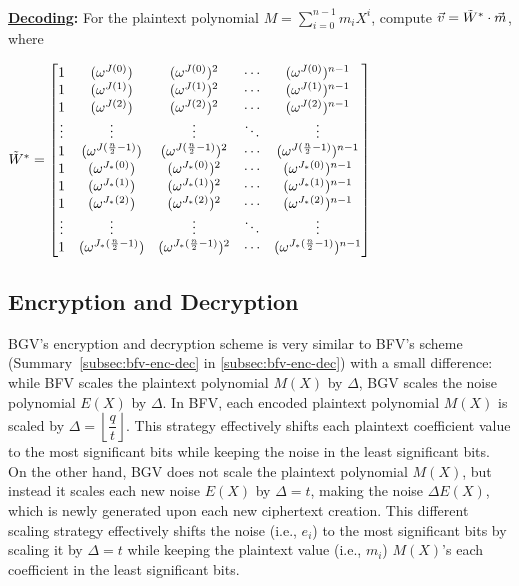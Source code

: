 \begin{tcolorbox}[title={\textbf{\tboxlabel{\ref*{subsec:bgv-encoding-decoding}} BGV's Encoding and Decoding}}]
$ $

\textbf{\underline{Decoding}:} For the plaintext polynomial $M = \sum\limits_{i=0}^{n-1} m_iX^i$, 
compute $\vec{v} = \tilde W^* \cdot \vec{m}$, where 

$\tilde{W}^* = \begin{bmatrix}
1 & (\omega^{J(0)}) & (\omega^{J(0)})^2 & \cdots & (\omega^{J(0)})^{n-1}\\
1 & (\omega^{J(1)}) & (\omega^{J(1)})^2 & \cdots & (\omega^{J(1)})^{n-1}\\
1 & (\omega^{J(2)}) & (\omega^{J(2)})^2 & \cdots & (\omega^{J(2)})^{n-1}\\
\vdots & \vdots & \vdots & \ddots & \vdots \\
1 & (\omega^{J(\frac{n}{2}-1)}) & (\omega^{J(\frac{n}{2}-1)})^2 & \cdots & (\omega^{J(\frac{n}{2}-1)})^{n-1}\\
1 & (\omega^{J_*(0)}) & (\omega^{J_*(0)})^2 & \cdots & (\omega^{J_*(0)})^{n-1}\\
1 & (\omega^{J_*(1)}) & (\omega^{J_*(1)})^2 & \cdots & (\omega^{J_*(1)})^{n-1}\\
1 & (\omega^{J_*(2)}) & (\omega^{J_*(2)})^2 & \cdots & (\omega^{J_*(2)})^{n-1}\\
\vdots & \vdots & \vdots & \ddots & \vdots \\
1 & (\omega^{J_*(\frac{n}{2}-1)}) & (\omega^{J_*(\frac{n}{2}-1)})^2 & \cdots & (\omega^{J_*(\frac{n}{2}-1)})^{n-1}\\
\end{bmatrix}$

\end{tcolorbox}


\subsection{Encryption and Decryption}
\label{subsec:bgv-enc-dec}

BGV's encryption and decryption scheme is very similar to BFV's scheme (Summary~\ref*{subsec:bfv-enc-dec} in \autoref{subsec:bfv-enc-dec}) with a small difference: while BFV scales the plaintext polynomial $M(X)$ by $\Delta$, BGV scales the noise polynomial $E(X)$ by $\Delta$. In BFV, each encoded plaintext polynomial $M(X)$ is scaled by $ \Delta = \left\lfloor \dfrac{q}{t} \right\rfloor$. This strategy effectively shifts each plaintext coefficient value to the most significant bits while keeping the noise in the least significant bits. On the other hand, BGV does not scale the plaintext polynomial $M(X)$, but instead it scales each new noise $E(X)$ by $\Delta = t$, making the noise $\Delta E(X)$, which is newly generated upon each new ciphertext creation. This different scaling strategy effectively shifts the noise (i.e., $e_i$) to the most significant bits by scaling it by $\Delta = t$ while keeping the plaintext value (i.e., $m_i$) $M(X)$'s each coefficient in the least significant bits. 

